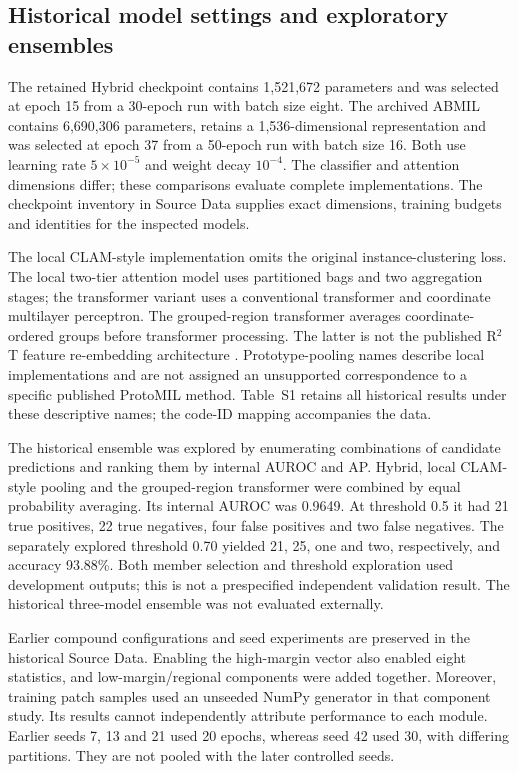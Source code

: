 \subsection{Historical model settings and exploratory ensembles}
The retained Hybrid checkpoint contains 1,521,672 parameters and was selected at epoch 15 from a 30-epoch run with batch size eight. The archived ABMIL contains 6,690,306 parameters, retains a 1,536-dimensional representation and was selected at epoch 37 from a 50-epoch run with batch size 16. Both use learning rate $5\times10^{-5}$ and weight decay $10^{-4}$. The classifier and attention dimensions differ; these comparisons evaluate complete implementations. The checkpoint inventory in Source Data supplies exact dimensions, training budgets and identities for the inspected models.

The local CLAM-style implementation omits the original instance-clustering loss. The local two-tier attention model uses partitioned bags and two aggregation stages; the transformer variant uses a conventional transformer and coordinate multilayer perceptron. The grouped-region transformer averages coordinate-ordered groups before transformer processing. The latter is not the published R$^2$T feature re-embedding architecture \citep{rrt2024}. Prototype-pooling names describe local implementations and are not assigned an unsupported correspondence to a specific published ProtoMIL method. Table~S1 retains all historical results under these descriptive names; the code-ID mapping accompanies the data.

The historical ensemble was explored by enumerating combinations of candidate predictions and ranking them by internal AUROC and AP. Hybrid, local CLAM-style pooling and the grouped-region transformer were combined by equal probability averaging. Its internal AUROC was 0.9649. At threshold 0.5 it had 21 true positives, 22 true negatives, four false positives and two false negatives. The separately explored threshold 0.70 yielded 21, 25, one and two, respectively, and accuracy 93.88\%. Both member selection and threshold exploration used development outputs; this is not a prespecified independent validation result. The historical three-model ensemble was not evaluated externally.

Earlier compound configurations and seed experiments are preserved in the historical Source Data. Enabling the high-margin vector also enabled eight statistics, and low-margin/regional components were added together. Moreover, training patch samples used an unseeded NumPy generator in that component study. Its results cannot independently attribute performance to each module. Earlier seeds 7, 13 and 21 used 20 epochs, whereas seed 42 used 30, with differing partitions. They are not pooled with the later controlled seeds.

